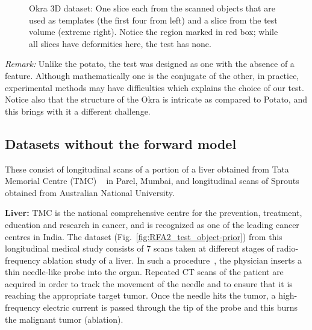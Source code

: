 \documentclass[journal]{IEEEtran}
\begin{document}
\begin{figure}[!h]
\begin{subfigure}[b]{0.148\linewidth}
\captionsetup{labelformat=empty}
        \caption{}
    \end{subfigure}
     \caption{Okra 3D dataset: One slice each from the scanned objects
       that are used as templates (the first four from left) and a
       slice from the test volume (extreme right). Notice the region
       marked in red box; while all slices have deformities here, the
       test has none.}
\label{fig:object-prior_test_okra}
\end{figure}

\textit{Remark:} Unlike the potato, the test was designed as one with
the absence of a feature.  Although mathematically one is the
conjugate of the other, in practice, experimental methods may have
difficulties which explains the choice of our test. Notice also that
the structure of the Okra is intricate as compared to Potato, and this
brings with it a different challenge.



\subsection{Datasets without the forward model}
These consist of longitudinal scans of a portion of a liver obtained
from Tata Memorial Centre (TMC) ~\cite{tmh} in Parel, Mumbai, and
longitudinal scans of Sprouts obtained from Australian National
University.

 \textbf{Liver:} %
TMC is the national comprehensive centre for the prevention,
treatment, education and research in cancer, and is recognized as one
of the leading cancer centres in India. The dataset
(Fig.~\ref{fig:RFA2_test_object-prior}) from this longitudinal medical
study consists of 7 scans taken at different stages of radio-frequency
ablation study of a liver. In such a procedure~\cite{Dong2015}, the
physician inserts a thin needle-like probe into the organ. Repeated CT
scans of the patient are acquired in order to track the movement of
the needle and to ensure that it is reaching the appropriate target
tumor. Once the needle hits the tumor, a high-frequency electric
current is passed through the tip of the probe and this burns the
malignant tumor (ablation). 
\end{document}
